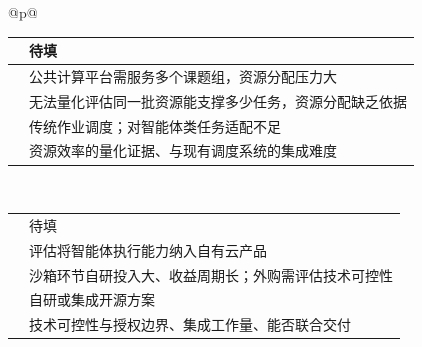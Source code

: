 \begin{longtable}{@{}p{\linewidth}@{}}
\begin{minipage}{\linewidth}
\begin{tabular}{@{}>{\raggedright\arraybackslash}p{}>{\raggedright\arraybackslash}p{}@{}}
\rowcolor{white} \TableHeaderText{访谈时间与方式} & 待填 \\ \hline
\rowcolor{white} \TableHeaderText{当前部署与使用情况} & 公共计算平台需服务多个课题组，资源分配压力大 \\ \hline
\rowcolor{white} \TableHeaderText{核心痛点} & 无法量化评估同一批资源能支撑多少任务，资源分配缺乏依据 \\ \hline
\rowcolor{white} \TableHeaderText{现有方案与不足} & 传统作业调度；对智能体类任务适配不足 \\ \hline
\rowcolor{white} \TableHeaderText{采购关注点} & 资源效率的量化证据、与现有调度系统的集成难度 \\ \hline
\end{tabular}
\end{minipage} \\[6pt]
\begin{minipage}{\linewidth}
\begin{tabular}{@{}>{\raggedright\arraybackslash}p{}>{\raggedright\arraybackslash}p{}@{}}
\hline
\rowcolor{WordTableHeader}\multicolumn{2}{@{}p{\linewidth}@{}}{\RecordHeading{编号：I-07\quad 受访角色与企业类型：云服务商 · 产品部门}} \\ \hline
\rowcolor{white} \TableHeaderText{访谈时间与方式} & 待填 \\ \hline
\rowcolor{white} \TableHeaderText{当前部署与使用情况} & 评估将智能体执行能力纳入自有云产品 \\ \hline
\rowcolor{white} \TableHeaderText{核心痛点} & 沙箱环节自研投入大、收益周期长；外购需评估技术可控性 \\ \hline
\rowcolor{white} \TableHeaderText{现有方案与不足} & 自研或集成开源方案 \\ \hline
\rowcolor{white} \TableHeaderText{采购关注点} & 技术可控性与授权边界、集成工作量、能否联合交付 \\ \hline
\end{tabular}
\end{minipage} \\[6pt]
\begin{minipage}{\linewidth}
\begin{tabular}{@{}>{\raggedright\arraybackslash}p{}>{\raggedright\arraybackslash}p{}@{}}
\hline
\rowcolor{WordTableHeader}\multicolumn{2}{@{}p{\linewidth}@{}}{\RecordHeading{编号：I-08\quad 受访角色与企业类型：系统集成商 · 解决方案部门}} \\ \hline

\end{tabular}
\end{minipage}
\end{longtable}

